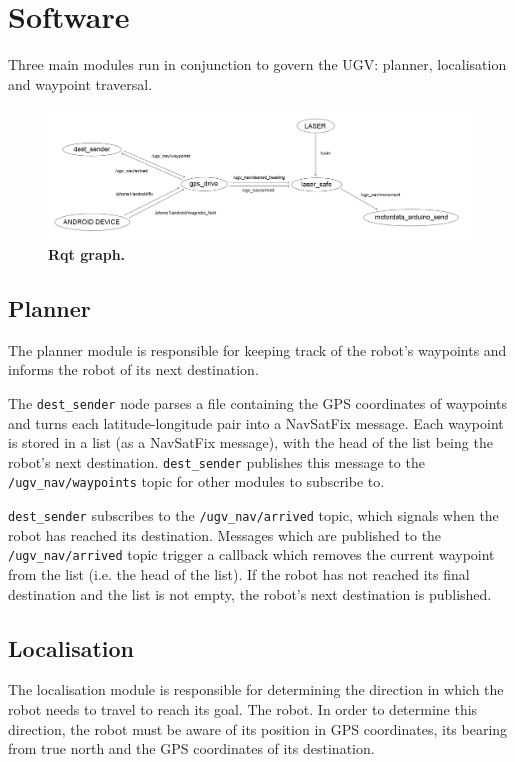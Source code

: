 \documentclass[titlepage,12pt,a4paper]{article}
\begin{document}
\section{Software}

Three main modules run in conjunction to govern the UGV: planner, localisation and waypoint traversal.

\begin{figure}[h]
	\centering
	\includegraphics[scale=0.255]{figures/rqt.png}
	\caption{\textbf{Rqt graph.}}
\end{figure}

\subsection{Planner}
The planner module is responsible for keeping track of the robot's waypoints and informs the robot of its next destination. 

The \verb|dest_sender| node parses a file containing the GPS coordinates of waypoints and turns each latitude-longitude pair into a NavSatFix message. Each waypoint is stored in a list (as a NavSatFix message), with the head of the list being the robot's next destination. \verb|dest_sender| publishes this message to the \verb|/ugv_nav/waypoints| topic for other modules to subscribe to.

\verb|dest_sender| subscribes to the \verb|/ugv_nav/arrived| topic, which signals when the robot has reached its destination. Messages which are published to the \verb|/ugv_nav/arrived| topic trigger a callback which removes the current waypoint from the list (i.e. the head of the list). If the robot has not reached its final destination and the list is not empty, the robot's next destination is published.

\pagebreak

\subsection{Localisation}
The localisation module is responsible for determining the direction in which the robot needs to travel to reach its goal. The robot. In order to determine this direction, the robot must be aware of its position in GPS coordinates, its bearing from true north and the GPS coordinates of its destination.
\end{document}
